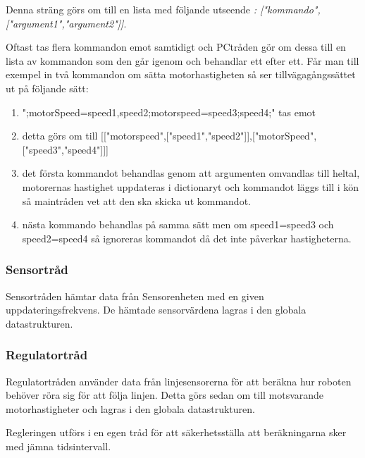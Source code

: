 Denna sträng görs om till en lista med följande utseende \textit{: ["kommando",["argument1","argument2"]]}.

Oftast tas flera kommandon emot samtidigt och PCtråden gör om dessa till en lista av kommandon som den går igenom och behandlar ett efter ett. Får man till exempel in två kommandon om sätta motorhastigheten så ser tillvägagångssättet ut på följande sätt:
\begin{enumerate}
\item ";motorSpeed=speed1,speed2;motorspeed=speed3;speed4;" tas emot
\item detta görs om till [["motorspeed",["speed1","speed2"]],["motorSpeed",["speed3","speed4"]]]
\item det första kommandot behandlas genom att argumenten omvandlas till heltal, motorernas hastighet uppdateras i dictionaryt och kommandot läggs till i kön så maintråden vet att den ska skicka ut kommandot.
\item nästa kommando behandlas på samma sätt men om speed1=speed3 och speed2=speed4 så ignoreras kommandot då det inte påverkar hastigheterna. 
\end{enumerate}

\subsubsection{Sensortråd}
Sensortråden hämtar data från Sensorenheten med en given uppdateringsfrekvens. De hämtade sensorvärdena lagras i den globala datastrukturen.

\subsubsection{Regulatortråd}
Regulatortråden använder data från linjesensorerna för att beräkna hur roboten behöver röra sig för att följa linjen. Detta görs sedan om till motsvarande motorhastigheter och lagras i den globala datastrukturen.

Regleringen utförs i en egen tråd för att säkerhetsställa att beräkningarna sker med jämna tidsintervall.

